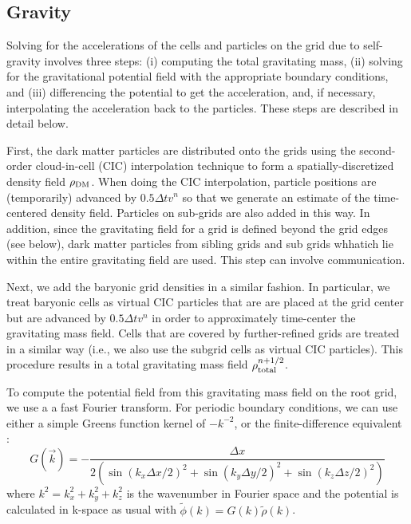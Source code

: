 \subsection{Gravity}
\label{sec.gravity}

Solving for the accelerations of the cells and particles on the grid due to self-gravity involves three steps: (i) computing the total gravitating mass, (ii) solving for the gravitational potential field with the appropriate boundary conditions, and (iii) differencing the potential to get the acceleration, and, if necessary, interpolating the acceleration back to the particles. These steps are described in detail below.

First, the dark matter particles are distributed onto the grids using the second-order cloud-in-cell (CIC) interpolation technique \citep{Hockney88} to form a spatially-discretized density field $\rho_{\rm DM}$.  When doing the CIC interpolation, particle positions are (temporarily) advanced by $0.5 \Delta t v^n$ so that we generate an estimate of the time-centered density field.  Particles on sub-grids are also added in this way.  In addition, since the gravitating field for a grid is defined beyond the grid edges (see below), dark matter particles from sibling grids and sub grids whhatich lie within the entire gravitating field are used.  This step can involve communication.

Next, we add the baryonic grid densities in a similar fashion.  In particular, we treat baryonic cells as virtual CIC particles that are are placed at the grid center but are advanced by $0.5 \Delta t v^n$ in order to approximately time-center the gravitating mass field.  Cells that are covered by further-refined grids are treated in a similar way (i.e., we also use the subgrid cells as virtual CIC particles).  This procedure results in a total gravitating mass field $\rho_{\rm total}^{n+1/2}$.

To compute the potential field from this gravitating mass field on the root grid, we use a a fast Fourier transform. For periodic boundary conditions, we can use either a simple Greens function kernel of $-k^{-2}$, or the finite-difference equivalent \citep{Hockney88}:
\begin{equation}
G(\vec{k}) = - \frac{\Delta x}{2 \left( \sin(k_x \Delta x/2)^2 + \sin(k_y \Delta y/2)^2 + \sin(k_z \Delta z/2)^2 \right) }
\end{equation}
where $k^2 = k_x^2 + k_y^2 + k_z^2$ is the wavenumber in Fourier space and the potential is calculated in k-space as usual with $\tilde{\phi}(k) = G(k) \tilde{\rho}(k)$.  

